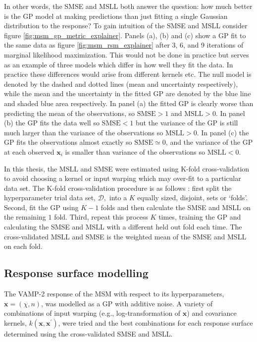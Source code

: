 In other words, the SMSE and MSLL both answer the question: how much better is the GP model at making predictions than just fitting a single Gaussian distribution to the response?  To gain intuition of the SMSE and MSLL consider figure \ref{fig:msm_gp_metric_explainer}. Panels (a), (b) and (c) show a GP fit to the same data as figure \ref{fig:msm_rsm_explainer} after 3, 6, and 9 iterations of marginal likelihood maximization. This would not be done in practice but serves as an example of three models which differ in how well they fit the data. In practice these differences would arise from different kernels etc. The null model is denoted by the dashed and dotted lines (mean and uncertainty respectively), while the mean and the uncertainty in the fitted GP are denoted by the blue line and shaded blue area respectively.  In panel (a) the fitted GP is clearly worse than predicting the mean of the observations, so  $\mathrm{SMSE} > 1$ and  $\mathrm{MSLL} > 0$. In panel (b) the GP fits the data well so $\mathrm{SMSE} < 1$ but the variance of the GP is still much larger than the variance of the observations so $\mathrm{MSLL} > 0$. In panel (c) the GP fits the observations almost exactly so $\mathrm{SMSE} \simeq 0$, and the variance of the GP at each observed $\mathbf{x}_{i}$ is smaller than variance of the observations so $\mathrm{MSLL} < 0$. 

In this thesis, the MSLL and SMSE were estimated using K-fold cross-validation \cite{friedman2001elements} to avoid choosing a kernel or input warping which may over-fit to a particular data set. The K-fold cross-validation procedure is as follows \cite{friedman2001elements}: first split the hyperparameter trial data set, $\mathcal{D},$ into a $K$ equally sized, disjoint, sets or `folds'. Second, fit the GP using $K-1$ folds and then calculate the SMSE and MSLL on the remaining $1$ fold. Third, repeat this process $K$ times, training the GP and calculating the SMSE and MSLL with a different held out fold each time. The cross-validated MSLL and SMSE is the weighted mean of the SMSE and MSLL on each fold. 

\subsection{Response surface modelling}\label{subsec:rsm}
The VAMP-2 response of the MSM with respect to its hyperparameters, $\mathbf{x} = (\chi, n)$, was modelled as a GP with additive noise. A variety of combinations of input warping (e.g., log-transformation of $\mathbf{x}$) and covariance kernels, $k(\mathbf{x}, \mathbf{x}^{\prime})$,  were tried and the best combinations for each response surface determined using the cross-validated SMSE and MSLL. 

